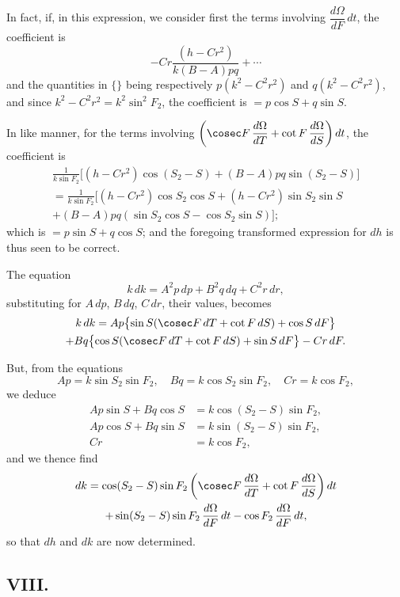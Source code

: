\documentclass[11pt,a4paper]{book}
\begin{document}
In fact, if, in this expression, we consider first the terms involving $\dfrac{d\Omega}{dF}\,dt$, the coefficient is
\[
-Cr\frac{(h-Cr^2)}{k(B-A)pq} + \cdots
\]
and the quantities in $\{\}$ being respectively $p(k^2-C^2r^2)$ and $q(k^2-C^2r^2)$, and since $k^2 - C^2r^2 = k^2\sin^2 F_2$, the coefficient is $= p\cos S + q\sin S$.

In like manner, for the terms involving $\left(\cosec F\,\dfrac{d\Omega}{dT} + \cot F\,\dfrac{d\Omega}{dS}\right)dt$, the coefficient is
\begin{multline*}
\frac{1}{k\sin F_2}\bigl[(h-Cr^2)\cos(S_2-S) + (B-A)pq\sin(S_2-S)\bigr] \\
= \frac{1}{k\sin F_2}\bigl[(h-Cr^2)\cos S_2\cos S + (h-Cr^2)\sin S_2\sin S \\
+ (B-A)pq(\sin S_2\cos S - \cos S_2\sin S)\bigr];
\end{multline*}
which is $= p\sin S + q\cos S$; and the foregoing transformed expression for $dh$ is thus seen to be correct.

The equation
\[
k\,dk = A^2p\,dp + B^2q\,dq + C^2r\,dr,
\]
substituting for $A\,dp$, $B\,dq$, $C\,dr$, their values, becomes
\begin{multline*}
k\,dk = Ap\bigl\{\sin S(\cosec F\,dT + \cot F\,dS) + \cos S\,dF\bigr\} \\
+ Bq\bigl\{\cos S(\cosec F\,dT + \cot F\,dS) + \sin S\,dF\bigr\} - Cr\,dF.
\end{multline*}

But, from the equations
\[
Ap = k\sin S_2\sin F_2, \quad Bq = k\cos S_2\sin F_2, \quad Cr = k\cos F_2,
\]
we deduce
\begin{align*}
Ap\sin S + Bq\cos S &= k\cos(S_2-S)\sin F_2, \\
Ap\cos S + Bq\sin S &= k\sin(S_2-S)\sin F_2, \\
Cr &= k\cos F_2,
\end{align*}
and we thence find
\begin{multline}
dk = \cos(S_2-S)\sin F_2\left(\cosec F\,\frac{d\Omega}{dT} + \cot F\,\frac{d\Omega}{dS}\right)dt \notag\\
+ \sin(S_2-S)\sin F_2\,\frac{d\Omega}{dF}\,dt - \cos F_2\,\frac{d\Omega}{dF}\,dt,
\end{multline}
so that $dh$ and $dk$ are now determined.

\subsection*{VIII.}
\end{document}
